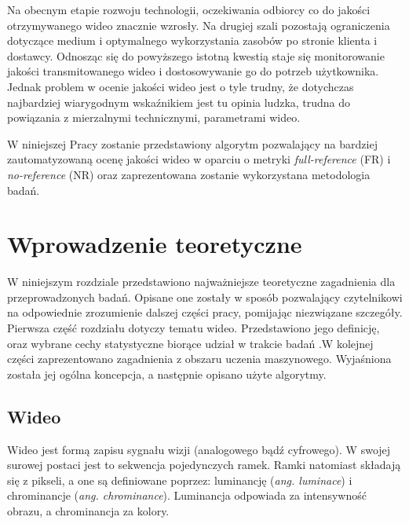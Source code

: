 Na obecnym etapie rozwoju technologii, oczekiwania odbiorcy co do jakości otrzymywanego wideo znacznie wzrosły. Na drugiej szali pozostają ograniczenia dotyczące medium i optymalnego wykorzystania zasobów po stronie klienta i dostawcy. Odnosząc się do powyższego istotną kwestią staje się monitorowanie jakości transmitowanego wideo i dostosowywanie go do potrzeb użytkownika. Jednak problem w ocenie jakości wideo jest o tyle trudny, że dotychczas najbardziej wiarygodnym wskaźnikiem jest tu opinia ludzka,  trudna do powiązania z mierzalnymi technicznymi, parametrami wideo.\par

W niniejszej Pracy zostanie przedstawiony algorytm pozwalający na bardziej zautomatyzowaną ocenę jakości wideo w oparciu o metryki \emph{full-reference} (FR) i \emph{no-reference} (NR) oraz zaprezentowana zostanie wykorzystana metodologia badań.



\chapter{Wprowadzenie teoretyczne}
\label{cha:pierwszyDokument}

W niniejszym rozdziale przedstawiono najważniejsze teoretyczne zagadnienia dla przeprowadzonych badań. Opisane one zostały w sposób pozwalający czytelnikowi na odpowiednie zrozumienie dalszej części pracy, pomijając niezwiązane szczegóły. Pierwsza część rozdziału dotyczy tematu wideo. Przedstawiono jego definicję, oraz wybrane cechy statystyczne biorące udział w trakcie badań .W kolejnej części zaprezentowano zagadnienia z obszaru uczenia maszynowego. Wyjaśniona została jej ogólna koncepcja, a następnie opisano użyte algorytmy.


\section{Wideo}

Wideo jest formą zapisu sygnału wizji (analogowego bądź cyfrowego). W swojej surowej postaci jest to sekwencja pojedynczych ramek. Ramki natomiast składają się z pikseli, a one są definiowane poprzez: luminancję ({\em ang. luminace}) i chrominancje ({\em ang. chrominance}). Luminancja odpowiada za intensywność obrazu, a chrominancja za kolory. 

